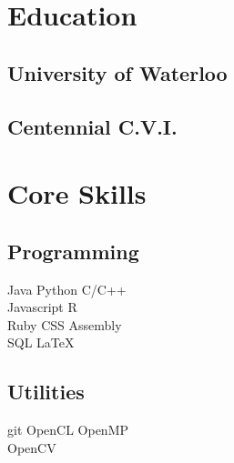 \documentclass[letterpaper]{deedy-resume} %
\begin{document}
\begin{minipage}[t]{0.33\textwidth} %


\section{Education} 

\subsection{University of Waterloo}


\sectionspace %


\subsection{Centennial C.V.I.}



\section{Core Skills}

\subsection{Programming}

Java \textbullet{} Python \textbullet{} C/C++ \\
Javascript \textbullet{} R \\ 
Ruby \textbullet{} CSS \textbullet{} Assembly \\
SQL \textbullet{} \LaTeX\

\sectionspace %

\subsection{Utilities}
git \textbullet{} OpenCL \textbullet{} OpenMP \\
OpenCV


\end{minipage}
\end{document}
